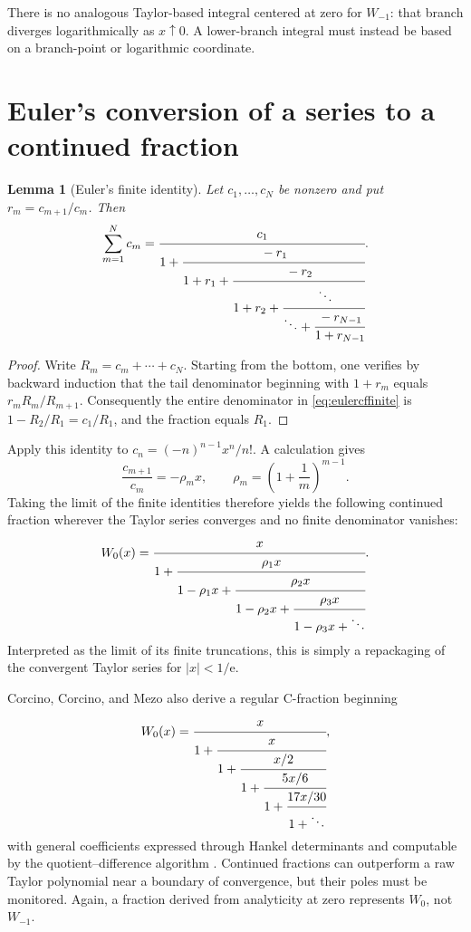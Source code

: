 \documentclass[11pt,oneside]{book}
\newtheorem{lemma}[theorem]{Lemma}
\theoremstyle{definition}
\theoremstyle{remark}
\newcommand{\ee}{\mathrm e}
\begin{document}
There is no analogous Taylor-based integral centered at zero for $W_{-1}$:
that branch diverges logarithmically as $x\uparrow0$.  A lower-branch integral
must instead be based on a branch-point or logarithmic coordinate.

\section{Euler's conversion of a series to a continued fraction}

\begin{lemma}[Euler's finite identity]\label{lem:eulercf}
Let $c_1,\ldots,c_N$ be nonzero and put $r_m=c_{m+1}/c_m$.  Then
\begin{equation}\label{eq:eulercffinite}
 \sum_{m=1}^N c_m
 =\cfrac{c_1}{1+
   \cfrac{-r_1}{1+r_1+
   \cfrac{-r_2}{1+r_2+
   \cfrac{\ddots}{\ddots+
   \cfrac{-r_{N-1}}{1+r_{N-1}}}}}}.
\end{equation}
\end{lemma}

\begin{proof}
Write $R_m=c_m+\cdots+c_N$.  Starting from the bottom, one verifies by
backward induction that the tail denominator beginning with $1+r_m$ equals
$r_mR_m/R_{m+1}$.  Consequently the entire denominator in
\eqref{eq:eulercffinite} is
$1-R_2/R_1=c_1/R_1$, and the fraction equals $R_1$.
\end{proof}

Apply this identity to
$c_n=(-n)^{n-1}x^n/n!$.  A calculation gives
\[
 \frac{c_{m+1}}{c_m}=-\rho_m x,
 \qquad
 \rho_m=\left(1+\frac1m\right)^{m-1}.
\]
Taking the limit of the finite identities therefore yields the following
continued fraction wherever the Taylor series converges and no finite
denominator vanishes:
\begin{equation}\label{eq:eulerWcf}
 W_0(x)=
 \cfrac{x}{1+
  \cfrac{\rho_1x}{1-\rho_1x+
  \cfrac{\rho_2x}{1-\rho_2x+
  \cfrac{\rho_3x}{1-\rho_3x+\ddots}}}}.
\end{equation}
Interpreted as the limit of its finite truncations, this is simply a
repackaging of the convergent Taylor series for $|x|<1/\ee$.

Corcino, Corcino, and Mezo also derive a regular C-fraction beginning
\begin{equation}\label{eq:corcinocf}
 W_0(x)=\cfrac{x}{1+
 \cfrac{x}{1+
 \cfrac{x/2}{1+
 \cfrac{5x/6}{1+
 \cfrac{17x/30}{1+\ddots}}}}},
\end{equation}
with general coefficients expressed through Hankel determinants and computable
by the quotient--difference algorithm \cite{corcino2018}.  Continued
fractions can outperform a raw Taylor polynomial near a boundary of
convergence, but their poles must be monitored.  Again, a fraction derived
from analyticity at zero represents $W_0$, not $W_{-1}$.
\end{document}
